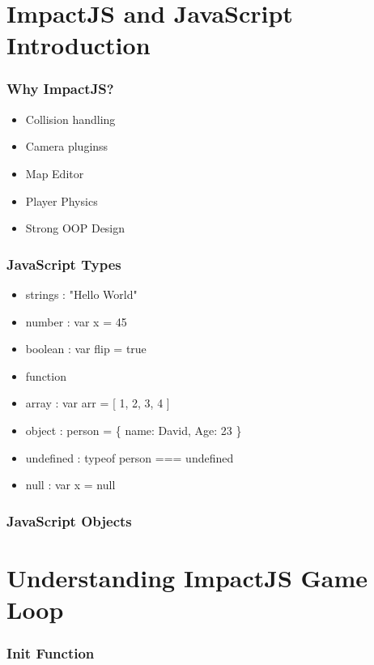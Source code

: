 \documentclass[red]{beamer}
\begin{document}
\section[Outline]{}

\section{ImpactJS and JavaScript Introduction}

\begin{frame}
  \frametitle{Why ImpactJS?}   %

  \begin{itemize}
  \item Collision handling
  \item Camera pluginss
  \item Map Editor
  \item Player Physics
  \item Strong OOP Design
  \end{itemize}
\end{frame}

\begin{frame}
	\frametitle{JavaScript Types}
	 \begin{itemize}
  		\item<1-> strings : "Hello World"
 		\item<2-> number : var x = 45
 		\item<3-> boolean : var flip = true
		\item<4-> function
		\item<4-> array : var arr = [ 1, 2, 3, 4 ]
		\item<5->object : person = \{ name: David, Age: 23 \}
		\item<6->undefined : typeof person === undefined
		\item<7->null : var x = null
 	 \end{itemize}
\end{frame}

\begin{frame}
 	\frametitle{JavaScript Objects}
		\lstI
\end{frame}

\section{Understanding ImpactJS Game Loop}
\begin{frame}
	\frametitle{Init Function}
		\lstll
\end{frame}
\end{document}
